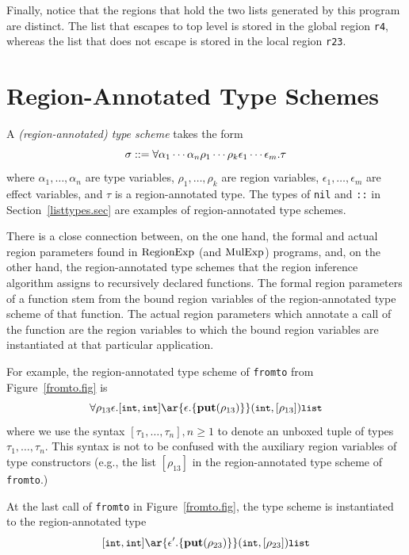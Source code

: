 \documentclass[12pt]{book}
\begin{document}
%
%
Finally, notice that the regions that hold the two lists generated by this
program are distinct.  The list that escapes to top level is stored in the
global region \lstinline{r4}, whereas the list that does not escape is stored in
the local region \lstinline{r23}.

\section{Region-Annotated Type Schemes}
\label{regtych.sec}
A
%
%
{\em (region-annotated) type scheme\/} takes the form
$$\sigma::=\forall\alpha_1\cdots\alpha_n\rho_1\cdots\rho_k\epsilon_1\cdots\epsilon_m.\tau$$
where $\alpha_1,\ldots,\alpha_n$ are type variables,
$\rho_1,\ldots,\rho_k$ are region variables,
$\epsilon_1,\ldots,\epsilon_m$ are
%
effect variables, and $\tau$ is a region-annotated type.
%
The types of \lstinline{nil} and \lstinline{::} in Section~\ref{listtypes.sec}
are examples of
%
%
region-annotated type schemes.

There is a close connection between, on the one hand, the formal and actual
%
%
region parameters found in $\hbox{\rm RegionExp}$ (and $\hbox{\rm MulExp}$) programs, and, on the other
hand, the region-annotated type schemes that the region inference algorithm
assigns to recursively declared functions. The formal region parameters of a
function stem from the bound region variables of the region-annotated type
scheme of that function.  The actual region parameters which annotate a call of
the function are the region variables to which the bound region variables are
instantiated at that particular application.

For example, the region-annotated type scheme of \lstinline{fromto} from
Figure~\ref{fromto.fig} is
$$\forall\rho_{13}\epsilon. [\kw{int}, \kw{int}]
\ar{\epsilon.\{\Put(\rho_{13})\}} (\kw{int},[\rho_{13}])\kw{list}$$ where we use
the syntax $[\tau_1, \ldots, \tau_n], n \geq 1$ to denote an unboxed tuple of
types $\tau_1, \ldots,\tau_n$. This syntax is not to be confused with the
auxiliary region variables of type constructors (e.g., the list $[\rho_{13}]$ in
the region-annotated type scheme of \lstinline{fromto}.)

At the last call of \lstinline{fromto} in Figure~\ref{fromto.fig}, the type
scheme is instantiated to the region-annotated type
$$[\kw{int}, \kw{int}] \ar{\epsilon'.\{\Put(\rho_{23})\}}
(\kw{int},[\rho_{23}])\kw{list}$$
\end{document}
